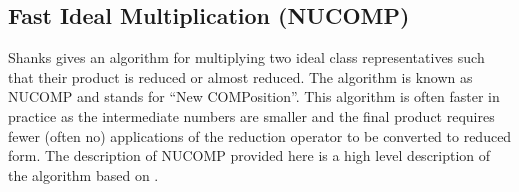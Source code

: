 \documentclass{ucalgthes1}
\theoremstyle{definition}
\begin{document}
\subsection{Fast Ideal Multiplication (NUCOMP)}
\label{subsec:nucomp}

Shanks \cite{Shanks1989} gives an algorithm for multiplying two ideal class representatives such that their product is reduced or almost reduced.  The algorithm is known as NUCOMP and stands for ``New COMPosition''.  This algorithm is often faster in practice as the intermediate numbers are smaller and the final product requires fewer (often no) applications of the reduction operator to be converted to reduced form. The description of NUCOMP provided here is a high level description of the algorithm based on \cite[pp.119-123]{Jacobson2009}.
\end{document}
